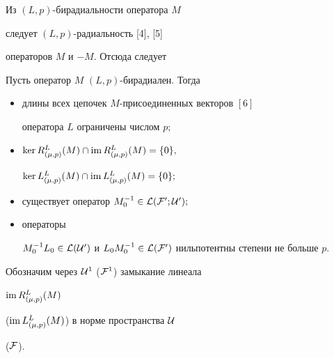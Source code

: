 \begin{notes}


Из $(L,p)$-бирадиальности оператора $M$


следует $(L,p)$-радиальность [4], [5]


операторов $M$ и $-M$. Отсюда следует


\end{notes}





\begin{lems}


Пусть оператор $M$   $(L,p)$-бирадиален. Тогда


\begin{itemize}


\item[(i)] длины всех цепочек $M$-присоединенных векторов $[6]$


оператора $L$ ограничены числом $p;$


\item[(ii)] $\ker R^L_{(\mu ,p)}(M) \cap \im


R^L_{(\mu ,p)}(M)=\{ 0\},$


$\ker L^L_{(\mu ,p)}(M) \cap \operatorname{im} L^L_{(\mu ,p)}(M)=\{ 0\};$


\item[(iii)]


существует оператор $M^{-1}_{0}\in \cal L (\cal F^{0};{\cal U}^{0});$


\item[(iv)] операторы


$M^{-1}_{0}L_0\in \cal L (\cal U^0)$ и $L_0M^{-1}_0\in


\cal L(\cal F^{0})$ нильпотентны степени не больше $p$.


\end{itemize}


\end{lems}





Обозначим через ${\cal U}^1$ (${\cal F}^1$) замыкание линеала


$\operatorname{im} R^L_{(\mu ,p)}(M)$


($\operatorname{im} L^L_{(\mu ,p)}(M)$) в норме пространства ${\cal U}$


(${\cal F}$).








